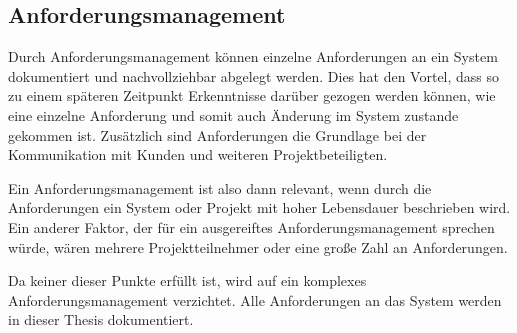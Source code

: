 \subsection{Anforderungsmanagement}
Durch Anforderungsmanagement können einzelne Anforderungen an ein System dokumentiert und nachvollziehbar abgelegt werden. Dies hat den Vortel, dass so zu einem späteren
Zeitpunkt Erkenntnisse darüber gezogen werden können, wie eine einzelne Anforderung und somit auch Änderung im System zustande gekommen ist. Zusätzlich sind Anforderungen
die Grundlage bei der Kommunikation mit Kunden und weiteren Projektbeteiligten. 

Ein Anforderungsmanagement ist also dann relevant, wenn durch die Anforderungen ein System oder Projekt mit hoher Lebensdauer beschrieben wird. Ein anderer Faktor, der für
ein ausgereiftes Anforderungsmanagement sprechen würde, wären mehrere Projektteilnehmer oder eine große Zahl an Anforderungen. \cite[S. 368-372]{rupp}

Da keiner dieser Punkte erfüllt ist, wird auf ein komplexes Anforderungsmanagement verzichtet. Alle Anforderungen an das System werden in dieser Thesis dokumentiert.
